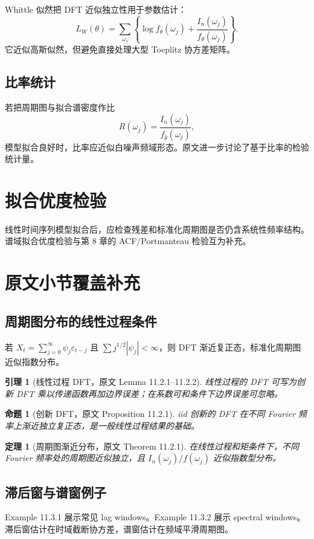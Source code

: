 \documentclass[11pt,a4paper,openany]{ctexbook}
\newtheorem{theorem}{定理}[section]
\newtheorem{lemma}{引理}[section]
\newtheorem{proposition}{命题}[section]
\begin{document}
Whittle 似然把 DFT 近似独立性用于参数估计：
\[
  L_W(\theta)=\sum_{\omega_j}
  \left\{\log f_\theta(\omega_j)+\frac{I_n(\omega_j)}{f_\theta(\omega_j)}\right\}.
\]
它近似高斯似然，但避免直接处理大型 Toeplitz 协方差矩阵。

\subsection{比率统计}

若把周期图与拟合谱密度作比
\[
  R(\omega_j)=\frac{I_n(\omega_j)}{f_{\hat\theta}(\omega_j)},
\]
模型拟合良好时，比率应近似白噪声频域形态。原文进一步讨论了基于比率的检验统计量。

\section{拟合优度检验}

线性时间序列模型拟合后，应检查残差和标准化周期图是否仍含系统性频率结构。谱域拟合优度检验与第 8 章的 ACF/Portmanteau 检验互为补充。

\section{原文小节覆盖补充}

\subsection{周期图分布的线性过程条件}
若 \(X_t=\sum_{j=0}^{\infty}\psi_j\varepsilon_{t-j}\) 且 \(\sum j^{1/2}|\psi_j|<\infty\)，则 DFT 渐近复正态，标准化周期图近似指数分布。

\begin{lemma}[线性过程 DFT，原文 Lemma 11.2.1--11.2.2]
线性过程的 DFT 可写为创新 DFT 乘以传递函数再加边界误差；在系数可和条件下边界误差可忽略。
\end{lemma}

\begin{proposition}[创新 DFT，原文 Proposition 11.2.1]
iid 创新的 DFT 在不同 Fourier 频率上渐近独立复正态，是一般线性过程结果的基础。
\end{proposition}

\begin{theorem}[周期图渐近分布，原文 Theorem 11.2.1]
在线性过程和矩条件下，不同 Fourier 频率处的周期图近似独立，且 \(I_n(\omega_j)/f(\omega_j)\) 近似指数型分布。
\end{theorem}

\subsection{滞后窗与谱窗例子}
Example 11.3.1 展示常见 lag windows。Example 11.3.2 展示 spectral windows。滞后窗估计在时域截断协方差，谱窗估计在频域平滑周期图。
\end{document}
